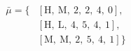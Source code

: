 \begin{equation}
\nonumber
\begin{aligned}
\bar{\mu} = \{  & \left[\text{H}, \ \text{M}, \ \text{2}, \ \text{2}, \ \text{4}, \ \text{0}\right], \\  & \left[\text{H}, \ \text{L}, \ \text{4}, \ \text{5}, \ \text{4}, \ \text{1}\right], \\  & \left[\text{M}, \ \text{M}, \ \text{2}, \ \text{5}, \ \text{4}, \ \text{1}\right]\} \\ 
\end{aligned}
\end{equation} \\ 